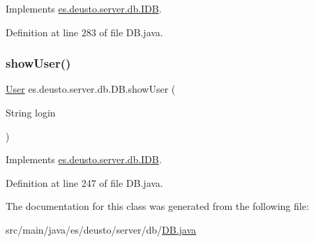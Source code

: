 Implements \hyperlink{interfacees_1_1deusto_1_1server_1_1db_1_1_i_d_b_a9023bdad77781d95fc2e556d1935f763}{es.\+deusto.\+server.\+db.\+I\+DB}.



Definition at line 283 of file D\+B.\+java.

\mbox{\label{classes_1_1deusto_1_1server_1_1db_1_1_d_b_ac85523faea523033439a932bbcab2c7e}} 
\subsubsection{\texorpdfstring{show\+User()}{showUser()}}
{\footnotesize\ttfamily \hyperlink{classes_1_1deusto_1_1server_1_1db_1_1data_1_1_user}{User} es.\+deusto.\+server.\+db.\+D\+B.\+show\+User (\begin{DoxyParamCaption}\item[{String}]{login }\end{DoxyParamCaption})}



Implements \hyperlink{interfacees_1_1deusto_1_1server_1_1db_1_1_i_d_b_aa2f6a5291fa8aa78d5a73b5878d17986}{es.\+deusto.\+server.\+db.\+I\+DB}.



Definition at line 247 of file D\+B.\+java.



The documentation for this class was generated from the following file\+:\begin{DoxyCompactItemize}
\item 
src/main/java/es/deusto/server/db/\hyperlink{_d_b_8java}{D\+B.\+java}\end{DoxyCompactItemize}
